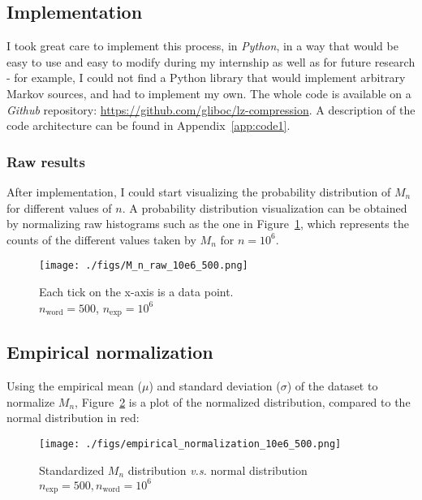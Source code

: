 \subsection{Implementation }

	I took great care to implement this process, in \emph{Python}, 
	in a way that would be easy to use and easy to modify during my 
	internship as well as for future research - for example, I 
	could not find a Python library that would implement arbitrary Markov 
	sources, and had to implement my own.
	The whole code is available on a \emph{Github} repository:
	{\color{gray} \url{https://github.com/gliboc/lz-compression}}.
	A description of the code architecture can be found in Appendix~\ref{app:code1}.

	\subsubsection{Raw results }
	
After implementation, I could start visualizing the probability
distribution of $M_n$ for different values of $n$. A probability 
distribution visualization can be obtained by normalizing raw 
histograms such as the one in Figure~\ref{fig:rawhisto}, which represents the counts of 
the different values taken by $M_n$ for $n=10^6$. 


 \begin{figure}[H]
	\centering
	   \texttt{[image: ./figs/M\_n\_raw\_10e6\_500.png]}	
		\caption{Each tick on the x-axis is a data point.\\
		$n_{\text{word}} = 500$, $n_{\text{exp}} = 10^6$}
		\label{fig:rawhisto}
   \end{figure}






	\subsection{Empirical normalization}


	Using the empirical mean ($\mu$) and standard deviation 
	($\sigma$) of the dataset to normalize $M_n$,
	Figure~\ref{fig:normalized} is a plot of the normalized distribution, 
	compared to the normal distribution in red:

  \begin{figure}[H]
		\centering
		\texttt{[image: ./figs/empirical\_normalization\_10e6\_500.png]}
		\centering
		\captionsetup{justification=centering,margin=2cm}
		\caption{Standardized $M_n$ distribution \textit{v.s.} normal distribution\\
			$n_{\text{exp}} = 500, n_{\text{word}} = 10^6$}
		\label{fig:normalized}
	\end{figure} 

